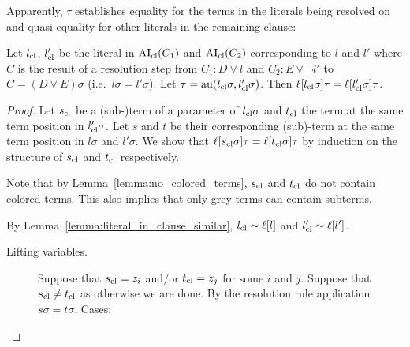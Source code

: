 \documentclass[,%
	paper=a4,%
	DIV12, %
	twoside=false,%
	liststotoc,
	bibtotoc,
	draft=false,%
	numbers=noendperiod
]{scrartcl}
\begin{document}
Apparently, $\tau$ establishes equality for the terms in the literals being resolved on and quasi-equality for other literals in the remaining clause:
\begin{lemma}
	\label{lemma:literals_clauses_equal}
	Let $l_\mathrm{cl}$, $l_\mathrm{cl}'$ be the literal in $\operatorname{AI}_\mathrm{cl}(C_1)$ and $\operatorname{AI}_\mathrm{cl}(C_2)$ corresponding to $l$ and $l'$ where 
	$C$ is the result of a resolution step from $C_1: D\lor l$ and $C_2: E\lor \lnot l'$ to $C = (D \lor E)\sigma$
	(i.e.~$l\sigma=l'\sigma$).
	Let $\tau = \operatorname{au}(l_\mathrm{cl}\sigma, l_\mathrm{cl}'\sigma)$. Then $\ell[l_\mathrm{cl}\sigma]\tau = \ell[l_\mathrm{cl}'\sigma]\tau$.
\end{lemma}
\begin{proof} 
	Let $s_\mathrm{cl}$ be a (sub-)term of a parameter of $l_\mathrm{cl}\sigma$ and $t_\mathrm{cl}$ the term at the same term position in $l_\mathrm{cl}'\sigma$.
	Let $s$ and $t$ be their corresponding (sub)-term at the same term position in $l\sigma$ and $l'\sigma$.
	We show that $\ell[s_\mathrm{cl}\sigma]\tau = \ell[t_\mathrm{cl}\sigma]\tau$ by induction on the structure of $s_\mathrm{cl}$ and $t_\mathrm{cl}$ respectively.

	Note that by Lemma~\ref{lemma:no_colored_terms}, $s_\mathrm{cl}$ and $t_\mathrm{cl}$ do not contain colored terms. This also implies that only grey terms can contain subterms.

	By Lemma~\ref{lemma:literal_in_clause_similar}, $l_\mathrm{cl} \sim \ell[l]$ and
	$l'_\mathrm{cl} \sim \ell[l']$. 

	\begin{description}
		\item[Lifting variables.]

			Suppose that $s_\mathrm{cl} = z_i$ and/or $t_\mathrm{cl} = z_j$ for some $i$ and $j$.
			Suppose that $s_\mathrm{cl} \neq t_\mathrm{cl}$ as otherwise we are done.
			By the resolution rule application $s\sigma = t\sigma$. Cases:
\end{description}
\end{proof}
\end{document}
